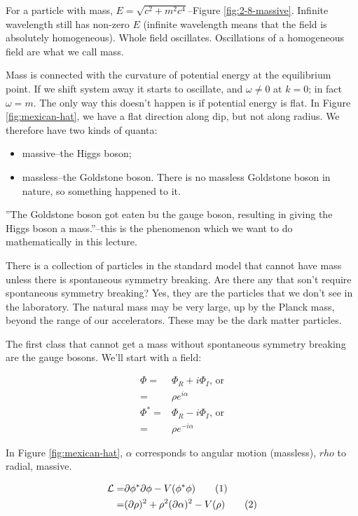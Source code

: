 \documentclass[]{article}
\newcommand\numberthis{\addtocounter{equation}{1}\tag{\theequation}}
\begin{document}
For a particle with mass, $E=\sqrt{c^2 + m^2 c^4}$--Figure \ref{fig:2-8-massive}. Infinite wavelength still has non-zero $E$ (infinite wavelength means that the field is absolutely homogeneous). Whole field oscillates. Oscillations of a homogeneous field are what we call mass.

Mass is connected with the curvature of potential energy at the equilibrium point. If we shift system away it starts to oscillate, and $\omega \ne 0$ at $k=0$; in fact $\omega = m$. The only way this doesn't happen is if potential energy is flat. In Figure \ref{fig:mexican-hat}, we have a flat direction along dip, but not along radius. We therefore have two kinds of quanta:
\begin{itemize}
	\item massive--the Higgs boson;
	\item massless--the Goldstone boson. There is no massless Goldstone boson in nature, so something happened to it.
\end{itemize}

''The Goldstone boson got eaten bu the gauge boson, resulting in giving the Higgs boson a mass.''--this is the phenomenon which we want to do mathematically in this lecture.

There is a collection of particles in the standard model that cannot have mass unless there is spontaneous symmetry breaking. Are there any that son't require spontaneous symmetry breaking? Yes, they are the particles that we don't see in the laboratory. The natural mass may be very large, up by the Planck mass, beyond the range of our accelerators. These may be the dark matter particles.

The first class that cannot get a mass without spontaneous symmetry breaking are the gauge bosons. We'll start with a field:

\begin{align*}
	\Phi =& \Phi_R + i \Phi_I \text{, or}\\
	=& \rho e^{i \alpha}\\
	\Phi^* =& \Phi_R - i \Phi_I \text{, or}\\
	=& \rho e^{-i \alpha}
\end{align*}

In Figure \ref{fig:mexican-hat}, $\alpha$ corresponds to angular motion (massless), $rho$  to radial, massive.

\begin{align*}
	\mathcal{L} =& \partial \phi^* \partial \phi - V(\phi^*\phi)  \numberthis \label{eq:mexican:LagrangeRI}\\
	=& (\partial \rho)^2 + \rho^2 (\partial \alpha)^2 - V(\rho) \numberthis \label{eq:mexican:Lagrange}
\end{align*} 
\end{document}
